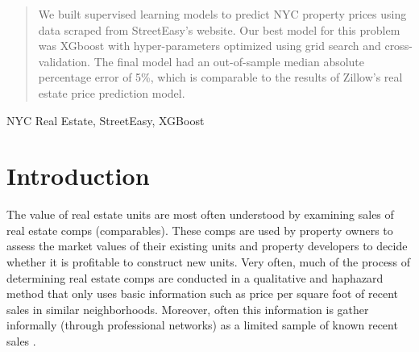 \documentclass[journal]{IEEEtran}
\begin{document}




\maketitle


\begin{abstract}
We built supervised learning models to predict NYC property prices using data scraped from StreetEasy's website. Our best model for this problem was XGboost with hyper-parameters optimized using grid search and cross-validation. The final model had an out-of-sample median absolute percentage error of 5\%, which is comparable to the results of Zillow's real estate price prediction model.
\end{abstract}

\begin{IEEEkeywords}
NYC Real Estate, StreetEasy, XGBoost
\end{IEEEkeywords}






%
\IEEEpeerreviewmaketitle



\section{Introduction}

The value of real estate units are most often understood by examining sales of real estate comps (comparables). These comps are used by property owners to assess the market values of their existing units and property developers to decide whether it is profitable to construct new units. Very often, much of the process of determining real estate comps are conducted in a qualitative and haphazard method that only uses basic information such as price per square foot of recent sales in similar neighborhoods. Moreover, often this information is gather informally (through professional networks) as a limited sample of known recent sales \cite{pagourtzi2003real}. 
\end{document}
